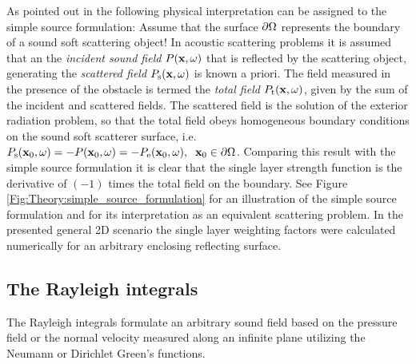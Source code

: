 \vspace{3mm}
As pointed out in \cite{Fazi2013:Equivalent_scattering, Fazi2010, Schultz2014:Comparing_approaches, Zotter2013:uniqueness} the following physical interpretation can be assigned to the simple source formulation: 
Assume that the surface $\partial \Omega$ represents the boundary of a sound soft scattering object!
In acoustic scattering problems it is assumed that an the \emph{incident sound field} $P(\mathbf{x},\omega)$ that is reflected by the scattering object, generating the \emph{scattered field} $P_{\mathrm{s}}(\mathbf{x},\omega)$ is known a priori.
The field measured in the presence of the obstacle is termed the \emph{total field} $P_{\mathrm{t}}(\mathbf{x},\omega)$, given by the sum of the incident and scattered fields.
The scattered field is the solution of the exterior radiation problem, so that the total field obeys homogeneous boundary conditions on the sound soft scatterer surface, i.e. $P_{\mathrm{s}}(\mathbf{x}_0,\omega) = -P(\mathbf{x}_0,\omega) = - P_{\mathrm{e}}(\mathbf{x}_0,\omega), \hspace{.2cm} \mathbf{x}_0 \in \partial \Omega$.
Comparing this result with the simple source formulation it is clear that the single layer strength function is the derivative of $(-1)$ times the total field on the boundary.
See Figure \ref{Fig:Theory:simple_source_formulation} for an illustration of the simple source formulation and for its interpretation as an equivalent scattering problem.
In the presented general 2D scenario the single layer weighting factors were calculated numerically for an arbitrary enclosing reflecting surface.

\subsection{The Rayleigh integrals}
\label{Section:Theory:Rayleigh}

The Rayleigh integrals formulate an arbitrary sound field based on the pressure field or the normal velocity measured along an infinite plane utilizing the Neumann or Dirichlet Green's functions.

